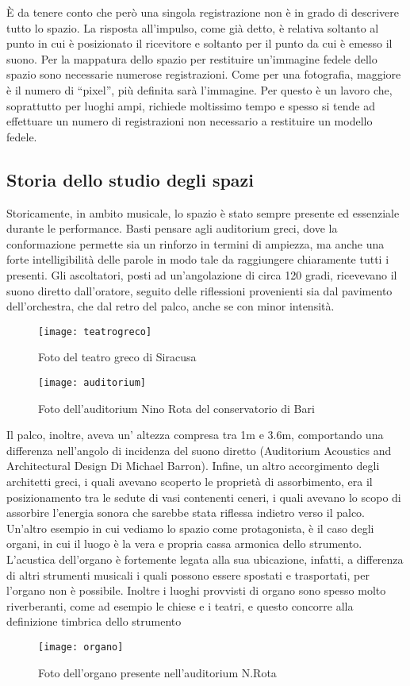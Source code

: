 È da tenere conto che però una singola registrazione non è in grado di descrivere tutto lo spazio. La risposta all’impulso, come già detto, è relativa soltanto al punto in cui è posizionato il ricevitore e soltanto per il punto da cui è emesso il suono. Per la mappatura dello spazio per restituire un'immagine fedele dello spazio sono necessarie numerose registrazioni. Come per una fotografia, maggiore è il numero di “pixel”, più definita sarà l’immagine. Per questo è un lavoro che, soprattutto per luoghi ampi, richiede moltissimo tempo e spesso si tende ad effettuare un numero di registrazioni non necessario a restituire un modello fedele.
\subsection{Storia dello studio degli spazi}
Storicamente, in ambito musicale, lo spazio è stato sempre presente ed essenziale durante le performance. Basti pensare agli auditorium greci, dove la conformazione permette sia un rinforzo in termini di ampiezza, ma anche una forte intelligibilità delle parole in modo tale da raggiungere chiaramente tutti i presenti.
Gli ascoltatori, posti ad un'angolazione di circa 120 gradi, ricevevano il suono diretto dall’oratore, seguito delle riflessioni provenienti sia dal pavimento dell’orchestra, che dal retro del palco, anche se con minor intensità.
\begin{figure}[h]
\centering
\texttt{[image: teatrogreco]}
\caption{Foto del teatro greco di Siracusa}
\label{fig:teatrogreco}
\texttt{[image: auditorium]}
\caption{Foto dell'auditorium Nino Rota del conservatorio di Bari}
\label{fig:auditorium}
\end{figure}
Il palco, inoltre, aveva un’ altezza compresa tra 1m e 3.6m, comportando una differenza nell’angolo di incidenza del suono diretto (Auditorium Acoustics and Architectural Design Di Michael Barron).
Infine, un altro accorgimento degli architetti greci, i quali avevano scoperto le proprietà di assorbimento, era il posizionamento tra le sedute di vasi contenenti ceneri, i quali avevano lo scopo di assorbire l’energia sonora che sarebbe stata riflessa indietro verso il palco.
\bigskip
Un’altro esempio in cui vediamo lo spazio come protagonista, è il caso degli organi, in cui il luogo è la vera e propria cassa armonica dello strumento.
L’acustica dell’organo è fortemente legata alla sua ubicazione, infatti, a differenza di altri strumenti musicali i quali possono essere spostati e trasportati, per l’organo non è possibile. Inoltre i luoghi provvisti di organo sono spesso molto riverberanti, come ad esempio le chiese e i teatri, e questo concorre alla definizione timbrica dello strumento
\begin{figure}[h]
\centering
\texttt{[image: organo]}
\caption{Foto dell'organo presente nell'auditorium N.Rota}
\label{fig:organo}
\end{figure}
